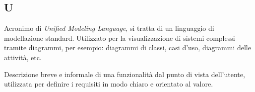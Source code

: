 \begin{center}
\section*{U}
\end{center}

Acronimo di \textit{Unified Modeling Language}, si tratta di un linguaggio di modellazione standard. Utilizzato per la visualizzazione di sistemi complessi tramite diagrammi, per esempio: diagrammi di classi, casi d'uso, diagrammi delle attività, etc.

Descrizione breve e informale di una funzionalità dal punto di vista dell’utente, utilizzata per definire i requisiti in modo chiaro e orientato al valore.

